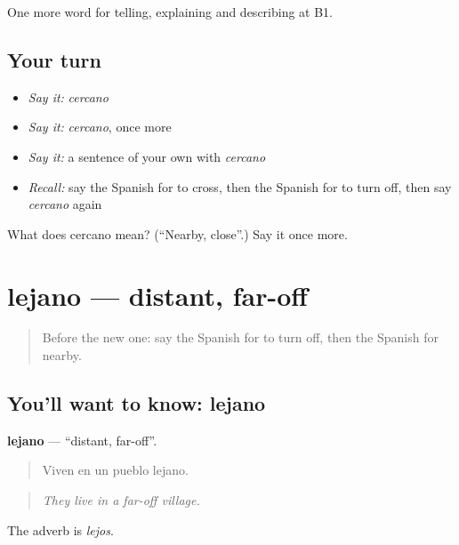 \begin{grammarlens}[title={What you've built}]
One more word for telling, explaining and describing at B1.
\end{grammarlens}

\subsection*{Your turn}
\begin{itemize}
\raggedright
  \item \emph{Say it:} \emph{cercano}
  \item \emph{Say it:} \emph{cercano}, once more
  \item \emph{Say it:} a sentence of your own with \emph{cercano}
  \item \emph{Recall:} say the Spanish for to cross, then the Spanish for to turn off, then say \emph{cercano} again
\end{itemize}

\begin{tcolorbox}[breakable,colback=teal!4,colframe=teal!35!black,title={Before you move on}]
What does cercano mean? (\textquotedblleft{}Nearby, close\textquotedblright{}.) Say it once more.
\end{tcolorbox}
\section[lejano]{lejano — distant, far-off}

\label{lesson:ES-C671-lejano}



\begin{quote}
Before the new one: say the Spanish for to turn off, then the Spanish for nearby.
\end{quote}

\subsection*{You'll want to know: lejano}
\textbf{lejano} — \textquotedblleft{}distant, far-off\textquotedblright{}.

\begin{quote}
Viven en un pueblo lejano.
\end{quote}

\begin{quote}
\emph{They live in a far-off village.}
\end{quote}

The adverb is \emph{lejos}.

